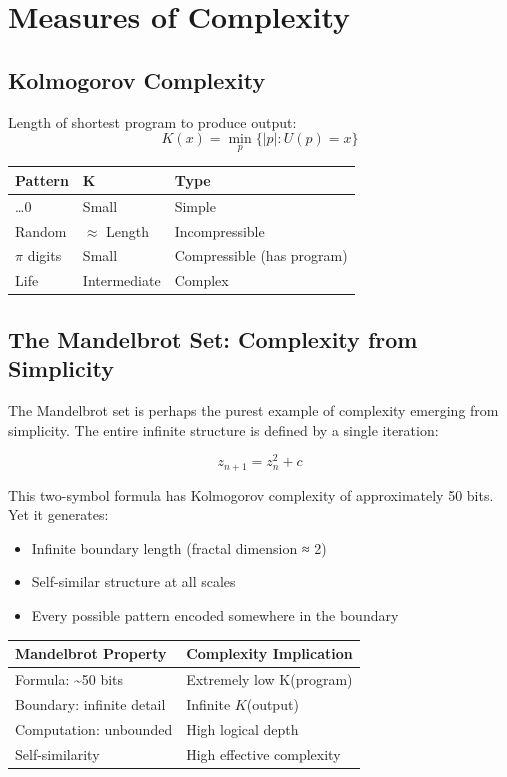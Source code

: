 \documentclass[
  11pt,
  letterpaper,
  twoside,
  openright]{book}
\providecommand{\tightlist}{%
  \setlength{\itemsep}{0pt}\setlength{\parskip}{0pt}}
\begin{document}
\section{Measures of Complexity}\label{measures-of-complexity}

\subsection{Kolmogorov Complexity}\label{kolmogorov-complexity}

Length of shortest program to produce output: \[
K(x) = \min_p \{ |p| : U(p) = x \}
\]

\begin{longtable}[]{@{}lll@{}}
\toprule\noalign{}
Pattern & K & Type \\
\midrule\noalign{}
\endhead
\bottomrule\noalign{}
\endlastfoot
000\ldots0 & Small & Simple \\
Random & \(\approx\) Length & Incompressible \\
\(\pi\) digits & Small & Compressible (has program) \\
Life & Intermediate & Complex \\
\end{longtable}

\subsection{The Mandelbrot Set: Complexity from
Simplicity}\label{the-mandelbrot-set-complexity-from-simplicity}

The Mandelbrot set is perhaps the purest example of complexity emerging
from simplicity. The entire infinite structure is defined by a single
iteration:

\[z_{n+1} = z_n^2 + c\]

This two-symbol formula has Kolmogorov complexity of approximately 50
bits. Yet it generates:

\begin{itemize}
\tightlist
\item
  Infinite boundary length (fractal dimension ≈ 2)
\item
  Self-similar structure at all scales
\item
  Every possible pattern encoded somewhere in the boundary
\end{itemize}

\begin{longtable}[]{@{}ll@{}}
\toprule\noalign{}
Mandelbrot Property & Complexity Implication \\
\midrule\noalign{}
\endhead
\bottomrule\noalign{}
\endlastfoot
Formula: \textasciitilde50 bits & Extremely low K(program) \\
Boundary: infinite detail & Infinite \(K\)(output) \\
Computation: unbounded & High logical depth \\
Self-similarity & High effective complexity \\
\end{longtable}
\end{document}
